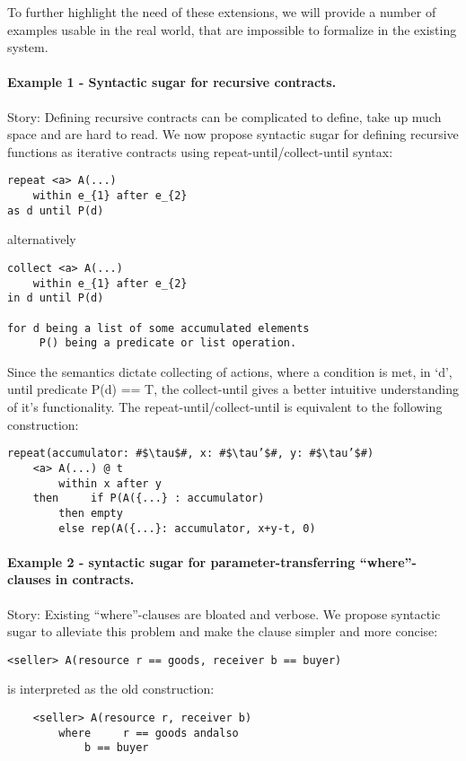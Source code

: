 \documentclass[10pt,a4paper,final,oneside,openany,article]{memoir}
\begin{document}
To further highlight the need of these extensions, we will provide a number of
examples usable in the real world, that are impossible to formalize in the
existing system.

\paragraph{Example 1 - Syntactic sugar for recursive contracts.}
Story: Defining recursive contracts can be complicated to define, take up much
space and are hard to read. We now propose syntactic sugar for defining
recursive functions as iterative contracts using repeat-until/collect-until
syntax:

\begin{lstlisting}
repeat <a> A(...)
    within e_{1} after e_{2}
as d until P(d)
\end{lstlisting}
alternatively
\begin{lstlisting}
collect <a> A(...)
    within e_{1} after e_{2}
in d until P(d)

for d being a list of some accumulated elements
     P() being a predicate or list operation.
\end{lstlisting}     
Since the semantics dictate collecting of actions, where a condition is met, in
‘d’, until predicate P(d) == T, the collect-until gives a better intuitive
understanding of it’s functionality.
The repeat-until/collect-until is equivalent to the following construction:
\begin{lstlisting}[escapechar=\#]
repeat(accumulator: #$\tau$#, x: #$\tau’$#, y: #$\tau’$#)
    <a> A(...) @ t
        within x after y
    then     if P(A({...} : accumulator)
        then empty
        else rep(A({...}: accumulator, x+y-t, 0)
\end{lstlisting}

\paragraph{Example 2 - syntactic sugar for parameter-transferring “where”-clauses in contracts.}
Story: Existing “where”-clauses are bloated and verbose. We propose syntactic sugar to alleviate this problem and make the clause simpler and more concise:

\begin{lstlisting}
<seller> A(resource r == goods, receiver b == buyer)
\end{lstlisting}
is interpreted as the old construction:
\begin{lstlisting}
    <seller> A(resource r, receiver b)
        where     r == goods andalso
            b == buyer
\end{lstlisting}
\end{document}

